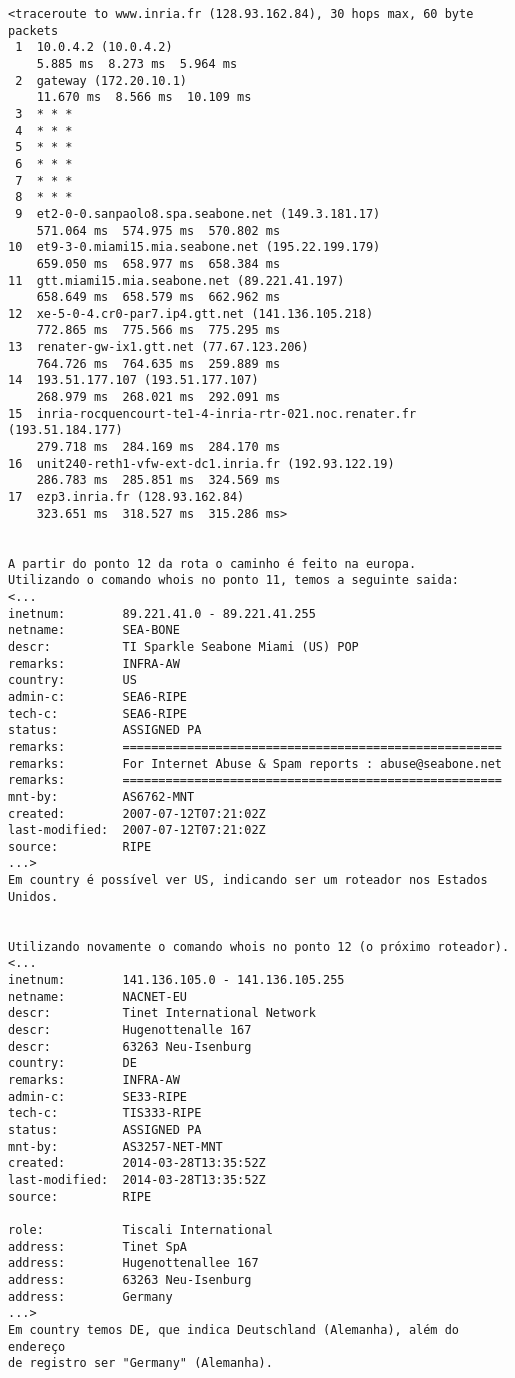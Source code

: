 \documentclass[12pt,letterpaper]{article}
\begin{document}
\begin{verbatim}
<traceroute to www.inria.fr (128.93.162.84), 30 hops max, 60 byte packets
 1  10.0.4.2 (10.0.4.2)
    5.885 ms  8.273 ms  5.964 ms
 2  gateway (172.20.10.1)
    11.670 ms  8.566 ms  10.109 ms
 3  * * *
 4  * * *
 5  * * *
 6  * * *
 7  * * *
 8  * * *
 9  et2-0-0.sanpaolo8.spa.seabone.net (149.3.181.17)
    571.064 ms  574.975 ms  570.802 ms
10  et9-3-0.miami15.mia.seabone.net (195.22.199.179)
    659.050 ms  658.977 ms  658.384 ms
11  gtt.miami15.mia.seabone.net (89.221.41.197)
    658.649 ms  658.579 ms  662.962 ms
12  xe-5-0-4.cr0-par7.ip4.gtt.net (141.136.105.218)
    772.865 ms  775.566 ms  775.295 ms
13  renater-gw-ix1.gtt.net (77.67.123.206)
    764.726 ms  764.635 ms  259.889 ms
14  193.51.177.107 (193.51.177.107)
    268.979 ms  268.021 ms  292.091 ms
15  inria-rocquencourt-te1-4-inria-rtr-021.noc.renater.fr (193.51.184.177)
    279.718 ms  284.169 ms  284.170 ms
16  unit240-reth1-vfw-ext-dc1.inria.fr (192.93.122.19)
    286.783 ms  285.851 ms  324.569 ms
17  ezp3.inria.fr (128.93.162.84)
    323.651 ms  318.527 ms  315.286 ms>
    
    
A partir do ponto 12 da rota o caminho é feito na europa.
Utilizando o comando whois no ponto 11, temos a seguinte saida:
<...
inetnum:        89.221.41.0 - 89.221.41.255
netname:        SEA-BONE
descr:          TI Sparkle Seabone Miami (US) POP
remarks:        INFRA-AW
country:        US 
admin-c:        SEA6-RIPE
tech-c:         SEA6-RIPE
status:         ASSIGNED PA
remarks:        =====================================================
remarks:        For Internet Abuse & Spam reports : abuse@seabone.net
remarks:        =====================================================
mnt-by:         AS6762-MNT
created:        2007-07-12T07:21:02Z
last-modified:  2007-07-12T07:21:02Z
source:         RIPE
...>
Em country é possível ver US, indicando ser um roteador nos Estados Unidos.


Utilizando novamente o comando whois no ponto 12 (o próximo roteador).
<...
inetnum:        141.136.105.0 - 141.136.105.255
netname:        NACNET-EU
descr:          Tinet International Network
descr:          Hugenottenalle 167
descr:          63263 Neu-Isenburg
country:        DE
remarks:        INFRA-AW
admin-c:        SE33-RIPE
tech-c:         TIS333-RIPE
status:         ASSIGNED PA
mnt-by:         AS3257-NET-MNT
created:        2014-03-28T13:35:52Z
last-modified:  2014-03-28T13:35:52Z
source:         RIPE

role:           Tiscali International
address:        Tinet SpA
address:        Hugenottenallee 167
address:        63263 Neu-Isenburg
address:        Germany
...>
Em country temos DE, que indica Deutschland (Alemanha), além do endereço
de registro ser "Germany" (Alemanha).

\end{verbatim}
\end{document}
